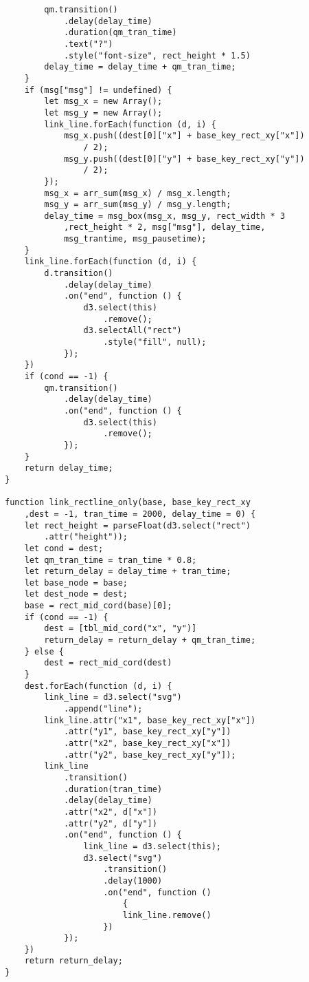\begin{lstlisting}
        qm.transition()
            .delay(delay_time)
            .duration(qm_tran_time)
            .text("?")
            .style("font-size", rect_height * 1.5)
        delay_time = delay_time + qm_tran_time;
    }
    if (msg["msg"] != undefined) {
        let msg_x = new Array();
        let msg_y = new Array();
        link_line.forEach(function (d, i) {
            msg_x.push((dest[0]["x"] + base_key_rect_xy["x"])
                / 2);
            msg_y.push((dest[0]["y"] + base_key_rect_xy["y"]) 
                / 2);
        });
        msg_x = arr_sum(msg_x) / msg_x.length;
        msg_y = arr_sum(msg_y) / msg_y.length;
        delay_time = msg_box(msg_x, msg_y, rect_width * 3
            ,rect_height * 2, msg["msg"], delay_time, 
            msg_trantime, msg_pausetime);
    }
    link_line.forEach(function (d, i) {
        d.transition()
            .delay(delay_time)
            .on("end", function () {
                d3.select(this)
                    .remove();
                d3.selectAll("rect")
                    .style("fill", null);
            });
    })
    if (cond == -1) {
        qm.transition()
            .delay(delay_time)
            .on("end", function () {
                d3.select(this)
                    .remove();
            });
    }
    return delay_time;
}

function link_rectline_only(base, base_key_rect_xy
    ,dest = -1, tran_time = 2000, delay_time = 0) {
    let rect_height = parseFloat(d3.select("rect")
        .attr("height"));
    let cond = dest;
    let qm_tran_time = tran_time * 0.8;
    let return_delay = delay_time + tran_time;
    let base_node = base;
    let dest_node = dest;
    base = rect_mid_cord(base)[0];
    if (cond == -1) {
        dest = [tbl_mid_cord("x", "y")]
        return_delay = return_delay + qm_tran_time;
    } else {
        dest = rect_mid_cord(dest)
    }
    dest.forEach(function (d, i) {
        link_line = d3.select("svg")
            .append("line");
        link_line.attr("x1", base_key_rect_xy["x"])
            .attr("y1", base_key_rect_xy["y"])
            .attr("x2", base_key_rect_xy["x"])
            .attr("y2", base_key_rect_xy["y"]);
        link_line
            .transition()
            .duration(tran_time)
            .delay(delay_time)
            .attr("x2", d["x"])
            .attr("y2", d["y"])
            .on("end", function () {
                link_line = d3.select(this);
                d3.select("svg")
                    .transition()
                    .delay(1000)
                    .on("end", function () 
                        {
                        link_line.remove()
                    })
            });
    })
    return return_delay;
}


\end{lstlisting}
